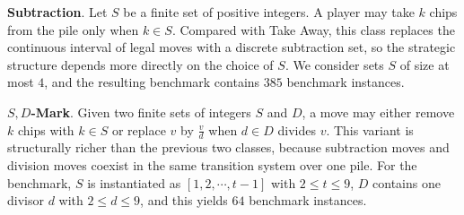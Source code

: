 \documentclass[review]{elsarticle}
\newcommand{\set}[1]{\{ #1 \}}
\newcommand{\tuple}[1]{\langle {#1} \rangle}
\newcommand{\true}{\top}
\newcommand{\statevar}{\mathcal{X}}
\newcommand{\act}{\mathcal{A}}
\newcommand{\constraint}{\mathcal{C}}
\newcommand{\estate}{\mathcal{E}}
\newcommand{\pre}{\mathtt{pre}}
\newcommand{\eff}{\mathtt{eff}}
\begin{document}
\textbf{Subtraction}. Let $S$ be a finite set of positive integers.
A player may take $k$ chips from the pile only when $k \in S$.
Compared with Take Away, this class replaces the continuous interval of legal moves with a discrete subtraction set, so the strategic structure depends more directly on the choice of $S$.
We consider sets $S$ of size at most $4$, and the resulting benchmark contains $385$ benchmark instances.

\textbf{$S,D$-Mark}. Given two finite sets of integers $S$ and $D$, a move may either remove $k$ chips with $k \in S$ or replace $v$ by $\frac{v}{d}$ when $d \in D$ divides $v$.
This variant is structurally richer than the previous two classes, because subtraction moves and division moves coexist in the same transition system over one pile.
For the benchmark, $S$ is instantiated as $[1,2,\cdots,t-1]$ with $2 \le t \le 9$, $D$ contains one divisor $d$ with $2 \le d \le 9$, and this yields $64$ benchmark instances.
\end{document}
